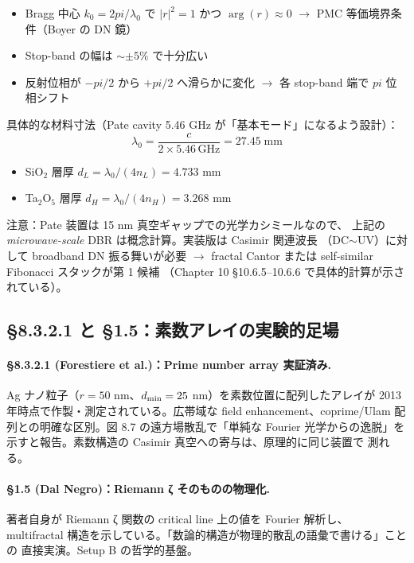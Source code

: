 \documentclass[11pt,a4paper]{article}
\def\pi{pi}%
\def\textbf#1{#1}%
\begin{document}
\begin{itemize}
\item Bragg 中心 $k_0 = 2\pi/\lambda_0$ で $|r|^2 = 1$ かつ $\arg(r) \approx 0$
  $\to$ \textbf{PMC 等価境界条件}（Boyer の DN 鏡）
\item Stop-band の幅は $\sim \pm 5\%$ で十分広い
\item 反射位相が $-\pi/2$ から $+\pi/2$ へ滑らかに変化 $\to$ 各 stop-band 端で
  $\pi$ 位相シフト
\end{itemize}

具体的な材料寸法（Pate cavity 5.46 GHz が「基本モード」になるよう設計）：
\[
  \lambda_0 = \frac{c}{2 \times 5.46\,\text{GHz}} = 27.45\;\text{mm}
\]
\begin{itemize}
\item SiO$_2$ 層厚 $d_L = \lambda_0/(4 n_L) = 4.733$ mm
\item Ta$_2$O$_5$ 層厚 $d_H = \lambda_0/(4 n_H) = 3.268$ mm
\end{itemize}

\textbf{注意}：Pate 装置は 15 nm 真空ギャップでの光学カシミールなので、
上記の \emph{microwave-scale} DBR は概念計算。実装版は Casimir 関連波長
（DC$\sim$UV）に対して \textbf{broadband DN 振る舞い}が必要 $\to$
\textbf{fractal Cantor} または \textbf{self-similar Fibonacci} スタックが第 1 候補
（Chapter 10 §10.6.5--10.6.6 で具体的計算が示されている）。

\subsection{§8.3.2.1 と §1.5：素数アレイの実験的足場}

\paragraph{§8.3.2.1 (Forestiere et al.)：Prime number array 実証済み.}
Ag ナノ粒子（$r=50$ nm、$d_{\rm min} = 25$ nm）を素数位置に配列したアレイが
2013 年時点で作製・測定されている。広帯域な field enhancement、coprime/Ulam
配列との明確な区別。図 8.7 の遠方場散乱で「単純な Fourier 光学からの逸脱」を
示すと報告。\textbf{素数構造の Casimir 真空への寄与は、原理的に同じ装置で
測れる}。

\paragraph{§1.5 (Dal Negro)：Riemann ζ そのものの物理化.}
著者自身が Riemann ζ 関数の critical line 上の値を Fourier 解析し、
multifractal 構造を示している。「数論的構造が物理的散乱の語彙で書ける」ことの
直接実演。Setup B の哲学的基盤。
\end{document}
